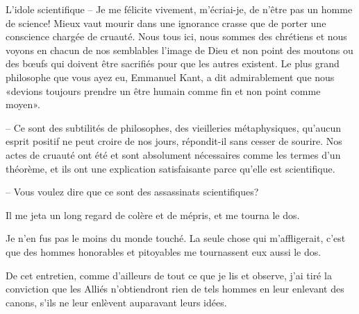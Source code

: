 \begin{chapter}{L'idole scientifique}
-- Je me félicite vivement, m'écriai-je, de n'être pas un homme de
science! Mieux vaut mourir dans une ignorance crasse que de porter une
conscience chargée de cruauté. Nous tous ici, nous sommes des chrétiens
et nous voyons en chacun de nos semblables l'image de Dieu et non point
des moutons ou des bœufs qui doivent être sacrifiés pour que les
autres existent. Le plus grand philosophe que vous ayez eu, Emmanuel
Kant, a dit admirablement que nous «devions toujours prendre un être
humain comme fin et non point comme moyen».

-- Ce sont des subtilités de philosophes, des vieilleries métaphysiques,
qu'aucun esprit positif ne peut croire de nos jours, répondit-il sans
cesser de sourire. Nos actes de cruauté ont été et sont absolument
nécessaires comme les termes d'un théorème, et ils ont une explication
satisfaisante parce qu'elle est scientifique.

-- Vous voulez dire que ce sont des assassinats scientifiques?

Il me jeta un long regard de colère et de mépris, et me tourna le dos.

Je n'en fus pas le moins du monde touché. La seule chose qui
m'affligerait, c'est que des hommes honorables et pitoyables me
tournassent eux aussi le dos.

De cet entretien, comme d'ailleurs de tout ce que je lis et observe,
j'ai tiré la conviction que les Alliés n'obtiendront rien de tels
hommes en leur enlevant des canons, s'ils ne leur enlèvent auparavant
leurs idées.

\end{chapter}


